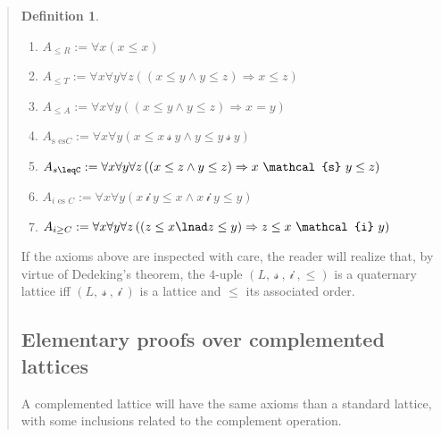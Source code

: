 \documentclass[a4paper, 12pt]{article}
\theoremstyle{definition}
\theoremstyle{definition}
\theoremstyle{definition}
\newtheorem{definition}{Definition}
\begin{document}
\begin{quote}
\begin{definition}
    \begin{enumerate}
        \item $A_{\leq R} := \forall x(x \leq x) $
        \item $A_{\leq T} := \forall x \forall y \forall z \left( (x \leq y \land  y \leq z) \Rightarrow x \leq z \right) $
        \item $A_{\leq A} := \forall x \forall y \left( (x \leq y \land  y \leq z) \Rightarrow x = y\right) $
        \item $A_{\text{s es} C} := \forall x \forall y \left( x \leq x ~\mathcal{s}~ y \land  y \leq y ~\mathcal{s}~ y \right) $
        \item $A_{s\leqC} := \forall x \forall y \forall z \left( (x \leq z \land  y \leq z) \Rightarrow x ~\mathcal{s}~ y \leq z \right)  $
        \item $A_{i\text{ es } C} := \forall x \forall y \left( x ~\mathcal{i}~y \leq x \land  x ~\mathcal{i}~ y \leq y \right)  $
        \item $A_{i \geq C} := \forall x \forall y \forall z \left( (z \leq x \lnad z \leq y) \Rightarrow z \leq x ~\mathcal{i}~ y\right) $
    \end{enumerate}
\end{definition}

If the axioms above are inspected with care, the reader will realize that, by
virtue of Dedeking's theorem, the $4$-uple $(L, ~\mathcal{s}~, ~\mathcal{i}~,
\leq)$ is a quaternary lattice iff $(L, ~\mathcal{s}~, ~\mathcal{i}~)$ is a
lattice and $\leq$ its associated order.

\subsection{Elementary proofs over complemented lattices}

A complemented lattice will have the same axioms than a standard lattice, with
some inclusions related to the complement operation.



\end{quote}
\end{document}
